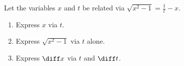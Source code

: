 Let the variables $x$ and $t$ be related via $\sqrt{x^2-1}=\frac{1}{t}-x$.
\begin{enumerate}[ref={\fcProblemRef}]
\item Express $x$ via $t$.
\item Express $\sqrt{x^2-1}$ via $t$ alone.
\item Express $\diff x$ via $t$ and $\diff t$.
\end{enumerate}